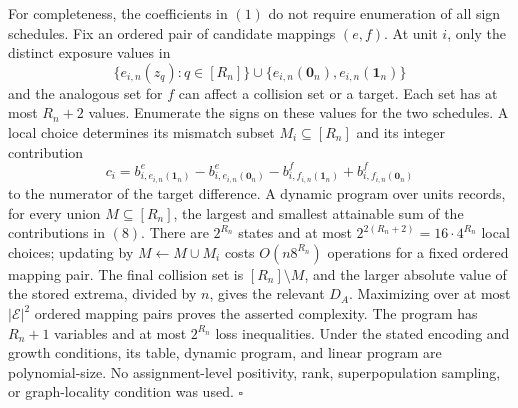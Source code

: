 For completeness, the coefficients in \((1)\) do not require enumeration of all sign schedules. Fix an ordered pair of candidate mappings \((e,f)\). At unit \(i\), only the distinct exposure values in
\[
 \{e_{i,n}(z_q):q\in[R_n]\}
 \cup\{e_{i,n}(\mathbf 0_n),e_{i,n}(\mathbf 1_n)\}
\]
and the analogous set for \(f\) can affect a collision set or a target. Each set has at most \(R_n+2\) values. Enumerate the signs on these values for the two schedules. A local choice determines its mismatch subset \(M_i\subseteq[R_n]\) and its integer contribution
\[
 c_i=
 b^e_{i,e_{i,n}(\mathbf 1_n)}-b^e_{i,e_{i,n}(\mathbf 0_n)}
 -b^f_{i,f_{i,n}(\mathbf 1_n)}+b^f_{i,f_{i,n}(\mathbf 0_n)} \tag{8}
\]
to the numerator of the target difference. A dynamic program over units records, for every union \(M\subseteq[R_n]\), the largest and smallest attainable sum of the contributions in \((8)\). There are \(2^{R_n}\) states and at most \(2^{2(R_n+2)}=16\cdot4^{R_n}\) local choices; updating by \(M\leftarrow M\cup M_i\) costs \(O(n8^{R_n})\) operations for a fixed ordered mapping pair. The final collision set is \([R_n]\setminus M\), and the larger absolute value of the stored extrema, divided by \(n\), gives the relevant \(D_A\). Maximizing over at most \(|\mathcal E|^2\) ordered mapping pairs proves the asserted complexity. The program has \(R_n+1\) variables and at most \(2^{R_n}\) loss inequalities. Under the stated encoding and growth conditions, its table, dynamic program, and linear program are polynomial-size. No assignment-level positivity, rank, superpopulation sampling, or graph-locality condition was used. \(\square\)